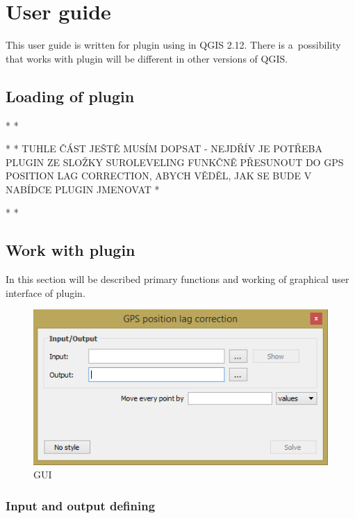 

\chapter{User guide}
\label{user-guide}

This user guide is written for plugin using in QGIS 2.12. There is a~possibility that works with plugin
will be different in other versions of QGIS. 

\section{Loading of plugin}
\label{plugin-load}

* 
* 

* 
* TUHLE ČÁST JEŠTĚ MUSÍM DOPSAT - NEJDŘÍV JE POTŘEBA PLUGIN ZE SLOŽKY SUROLEVELING FUNKČNĚ PŘESUNOUT DO GPS POSITION LAG CORRECTION, ABYCH VĚDĚL, JAK SE BUDE V NABÍDCE PLUGIN JMENOVAT
*

* 
*

\section{Work with plugin}
\label{work}

In this section will be described primary functions and working of graphical user interface of plugin. 

  \begin{figure}[H]
   \centering
	\includegraphics[scale=0.75]{./pictures/gui.png}
	\caption[GUI]{GUI}
      \label{fig:gui}
  \end{figure}

\subsection{Input and output defining}
\label{input-output}

